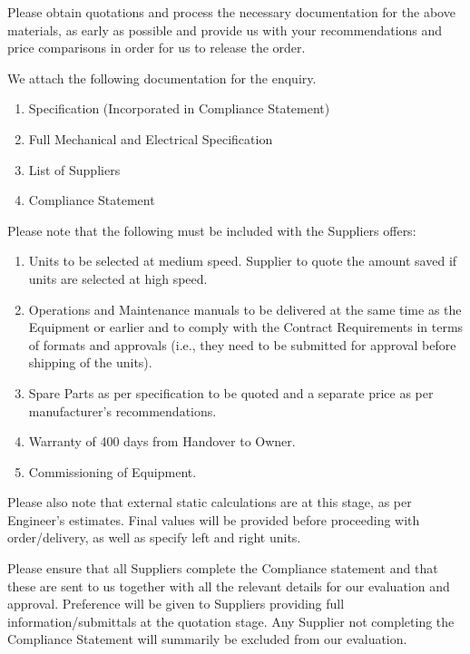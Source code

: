 \documentclass[a4paper,11pt,oneside]{article}
\begin{document}
\begin{mcdletter}


Please obtain quotations and process the necessary documentation for the above materials, as early as possible and provide us with your recommendations and price comparisons in order for us to release the order. 

We attach the following documentation for the enquiry. 

\begin{enumerate}

\item Specification (Incorporated in Compliance Statement)
\item Full Mechanical and Electrical Specification
\item List of Suppliers
\item Compliance Statement
\end{enumerate}

Please note that the following must be included with the Suppliers offers:

\begin{enumerate}
\item Units to be selected at medium speed. Supplier to quote the amount saved if units are selected at high speed.
\item  Operations and Maintenance manuals to be delivered at the same time as the Equipment or earlier and to comply with the Contract Requirements in terms of formats and approvals (i.e., they need to be submitted for approval before shipping of the units).
\item Spare Parts as per specification to be quoted and a separate price as per manufacturer's recommendations.
\item Warranty of 400 days from Handover to Owner.
\item Commissioning of Equipment.
\end{enumerate}

Please also note that external static calculations are at this stage, as per Engineer's estimates. Final values will be provided before proceeding with order/delivery, as well as specify left and right units.


Please ensure that all Suppliers complete the Compliance statement and that these are sent to us together with all the relevant details for our evaluation and approval. Preference will be given to Suppliers providing full information/submittals at the quotation stage. Any Supplier not completing the Compliance Statement will summarily be excluded from our evaluation.



\end{mcdletter}
\end{document}
